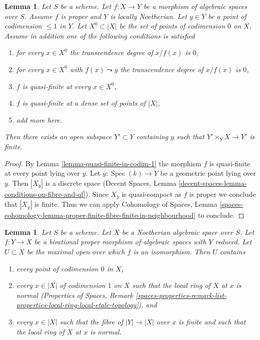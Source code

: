 \documentclass{stacks-project}
\theoremstyle{plain}
\newtheorem{lemma}[subsection]{Lemma}
\theoremstyle{definition}
\theoremstyle{remark}
\numberwithin{equation}{subsection}
\def\Spec{\mathop{\mathrm{Spec}}}
\begin{document}
\begin{lemma}
\label{lemma-finite-in-codim-1}
Let $S$ be a scheme. Let $f : X \to Y$ be a morphism of algebraic spaces
over $S$. Assume $f$ is proper and $Y$ is locally Noetherian.
Let $y \in Y$ be a point of codimension $\leq 1$ in $Y$.
Let $X^0 \subset |X|$ be the set of points of codimension $0$ on $X$.
Assume in addition one of the
following conditions is satisfied
\begin{enumerate}
\item for every $x \in X^0$ the transcendence degree of $x/f(x)$ is $0$,
\item for every $x \in X^0$ with $f(x) \leadsto y$ the transcendence degree
of $x/f(x)$ is $0$,
\item $f$ is quasi-finite at every $x \in X^0$,
\item $f$ is quasi-finite at a dense set of points of $|X|$,
\item add more here.
\end{enumerate}
Then there exists an open subspace $Y' \subset Y$ containing $y$ such that
$Y' \times_Y X \to Y'$ is finite.
\end{lemma}

\begin{proof}
By Lemma \ref{lemma-quasi-finite-in-codim-1} the morphism $f$ is
quasi-finite at every point lying over $y$. Let $\overline{y} : \Spec(k) \to Y$
be a geometric point lying over $y$. Then $|X_{\overline{y}}|$ is a
discrete space (Decent Spaces, Lemma
\ref{decent-spaces-lemma-conditions-on-fibre-and-qf}).
Since $X_{\overline{y}}$ is quasi-compact as $f$ is proper we conclude
that $|X_{\overline{y}}|$ is finite.
Thus we can apply Cohomology of Spaces, Lemma
\ref{spaces-cohomology-lemma-proper-finite-fibre-finite-in-neighbourhood}
to conclude.
\end{proof}

\begin{lemma}
\label{lemma-modification-normal-iso-over-codimension-1}
Let $S$ be a scheme. Let $X$ be a Noetherian algebraic space over $S$.
Let $f : Y \to X$ be a birational proper morphism of algebraic spaces
with $Y$ reduced.
Let $U \subset X$ be the maximal open over which $f$ is an isomorphism.
Then $U$ contains
\begin{enumerate}
\item every point of codimension $0$ in $X$,
\item every $x \in |X|$ of codimension $1$ on $X$ such that the local ring of
$X$ at $x$ is normal (Properties of Spaces, Remark
\ref{spaces-properties-remark-list-properties-local-ring-local-etale-topology}),
and
\item every $x \in |X|$ such that the fibre of $|Y| \to |X|$ over $x$ is
finite and such that the local ring of $X$ at $x$ is normal.
\end{enumerate}
\end{lemma}
\end{document}
